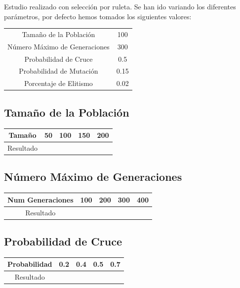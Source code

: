 \documentclass[12pt]{article}
\begin{document}
	Estudio realizado con selección por ruleta. Se han ido variando los diferentes parámetros, por defecto hemos tomados los siguientes valores:

\begin{table}[H]
\begin{center}
\begin{tabular}{|cc|} \hline
Tamaño de la Población   & 100  \\  
Número Máximo de Generaciones  &  300 \\
Probabilidad de Cruce & 0.5 \\
Probabilidad de Mutación & 0.15 \\
Porcentaje de Elitismo & 0.02 \\ \hline
\end{tabular}
\end{center}
\end{table}


\subsection{Tamaño de la Población}

\begin{table}[H]
\begin{center}
\begin{tabular}{|ccccc|} \hline
Tamaño	   & 50 & 100 & 150 & 200 \\  \hline
Resultado  &   &  &  &  \\ \hline
\end{tabular}
\end{center}
\end{table}

	

\subsection{Número Máximo de Generaciones}
\begin{table}[H]
\begin{center}
\begin{tabular}{|ccccc|} \hline
Num Generaciones  & 100 & 200 & 300 & 400 \\  \hline
Resultado  &   &  &  & \\ \hline
\end{tabular}
\end{center}
\end{table}	

	

\subsection{Probabilidad de Cruce}
\begin{table}[H]
\begin{center}
\begin{tabular}{|ccccc|} \hline
Probabilidad   & 0.2 & 0.4 & 0.5 & 0.7 \\  \hline
Resultado  &  &  &  &  \\ \hline
\end{tabular}
\end{center}
\end{table}
\end{document}
